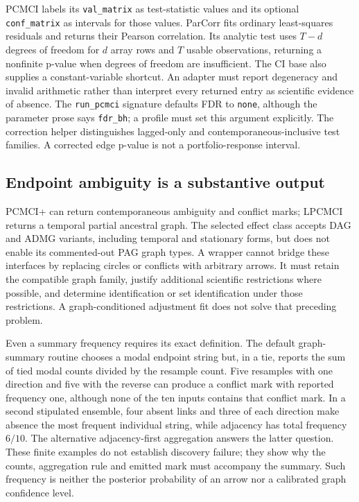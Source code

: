 PCMCI labels its \texttt{val\_matrix} as test-statistic values and its optional \texttt{conf\_matrix} as intervals for those values. ParCorr fits ordinary least-squares residuals and returns their Pearson correlation. Its analytic test uses $T-d$ degrees of freedom for $d$ array rows and $T$ usable observations, returning a nonfinite p-value when degrees of freedom are insufficient. The CI base also supplies a constant-variable shortcut. An adapter must report degeneracy and invalid arithmetic rather than interpret every returned entry as scientific evidence of absence. The \texttt{run\_pcmci} signature defaults FDR to \texttt{none}, although the parameter prose says \texttt{fdr\_bh}; a profile must set this argument explicitly. The correction helper distinguishes lagged-only and contemporaneous-inclusive test families. A corrected edge p-value is not a portfolio-response interval. \cite{exec23_tigramite_reuse_source}

\subsection{Endpoint ambiguity is a substantive output}
\label{exec23:tigramite-graph}
PCMCI+ can return contemporaneous ambiguity and conflict marks; LPCMCI returns a temporal partial ancestral graph. The selected effect class accepts DAG and ADMG variants, including temporal and stationary forms, but does not enable its commented-out PAG graph types. A wrapper cannot bridge these interfaces by replacing circles or conflicts with arbitrary arrows. It must retain the compatible graph family, justify additional scientific restrictions where possible, and determine identification or set identification under those restrictions. A graph-conditioned adjustment fit does not solve that preceding problem. \cite{exec23_tigramite_reuse_source}

Even a summary frequency requires its exact definition. The default graph-summary routine chooses a modal endpoint string but, in a tie, reports the sum of tied modal counts divided by the resample count. Five resamples with one direction and five with the reverse can produce a conflict mark with reported frequency one, although none of the ten inputs contains that conflict mark. In a second stipulated ensemble, four absent links and three of each direction make absence the most frequent individual string, while adjacency has total frequency $6/10$. The alternative adjacency-first aggregation answers the latter question. These finite examples do not establish discovery failure; they show why the counts, aggregation rule and emitted mark must accompany the summary. Such frequency is neither the posterior probability of an arrow nor a calibrated graph confidence level. \cite{exec23_tigramite_reuse_source,exec23_tigramite_reference}

